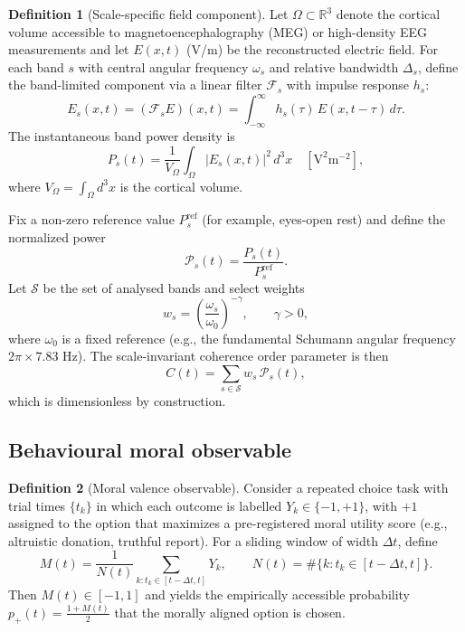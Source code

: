 \documentclass[12pt,a4paper]{article}
\theoremstyle{definition}
\newtheorem{definition}{Definition}[section]
\begin{document}
\begin{definition}[Scale-specific field component]
Let $\Omega \subset \mathbb{R}^3$ denote the cortical volume accessible to magnetoencephalography (MEG) or high-density EEG measurements and let $E(x,t)$ (V/m) be the reconstructed electric field. For each band $s$ with central angular frequency $\omega_s$ and relative bandwidth $\Delta_s$, define the band-limited component via a linear filter $\mathcal{F}_s$ with impulse response $h_s$:
\begin{equation}
E_s(x,t) = (\mathcal{F}_s E)(x,t) = \int_{-\infty}^{\infty} h_s(\tau) \, E(x,t-\tau) \, d\tau .
\end{equation}
The instantaneous band power density is
\begin{equation}
P_s(t) = \frac{1}{V_\Omega} \int_{\Omega} |E_s(x,t)|^2 \, d^3x \quad [\mathrm{V}^2 \mathrm{m}^{-2}],
\end{equation}
where $V_\Omega = \int_{\Omega} d^3x$ is the cortical volume.
\end{definition}

Fix a non-zero reference value $P_s^{\text{ref}}$ (for example, eyes-open rest) and define the normalized power
\begin{equation}
\mathcal{P}_s(t) = \frac{P_s(t)}{P_s^{\text{ref}}}.
\end{equation}
Let $\mathcal{S}$ be the set of analysed bands and select weights
\begin{equation}
w_s = \left( \frac{\omega_s}{\omega_0} \right)^{-\gamma}, \qquad \gamma > 0,
\end{equation}
where $\omega_0$ is a fixed reference (e.g., the fundamental Schumann angular frequency $2\pi \times 7.83$ Hz). The scale-invariant coherence order parameter is then
\begin{equation}
C(t) = \sum_{s \in \mathcal{S}} w_s \, \mathcal{P}_s(t),
\end{equation}
which is dimensionless by construction.

\subsection{Behavioural moral observable}

\begin{definition}[Moral valence observable]
Consider a repeated choice task with trial times $\{t_k\}$ in which each outcome is labelled $Y_k \in \{-1,+1\}$, with $+1$ assigned to the option that maximizes a pre-registered moral utility score (e.g., altruistic donation, truthful report). For a sliding window of width $\Delta t$, define
\begin{equation}
M(t) = \frac{1}{N(t)} \sum_{k : t_k \in [t-\Delta t, t]} Y_k, \qquad N(t) = \#\{k : t_k \in [t-\Delta t, t]\}.
\end{equation}
Then $M(t) \in [-1,1]$ and yields the empirically accessible probability $p_{+}(t) = \frac{1+M(t)}{2}$ that the morally aligned option is chosen.
\end{definition}
\end{document}
